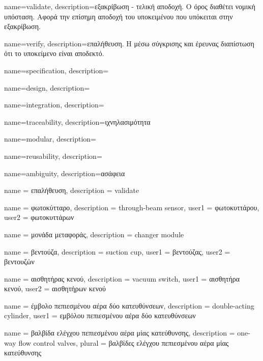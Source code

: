 ﻿%

	{name={validate}, description={εξακρίβωση - τελική αποδοχή. Ο όρος διαθέτει νομική υπόσταση. Αφορά την επίσημη αποδοχή του υποκειμένου που υπόκειται στην εξακρίβωση.}}

	{name={verify}, description={επαλήθευση. Η μέσω σύγκρισης και έρευνας διαπίστωση ότι το υποκείμενο είναι αποδεκτό.}}
	
	{name={specification}, description={}}
	
	{name={design}, description={}}
	
	{name={integration}, description={}}

	{name={traceability}, description={ιχνηλασιμότητα}}

	{name={modular}, description={}}
	
	{name={reusability}, description={}}
	
	{name={ambiguity}, description={ασάφεια}}
	
	
	

	{name			= {επαλήθευση},
	 description		= {validate}
	}
	
	{name			= {φωτοκύτταρο},
	 description	= {through-beam sensor},
	 user1			= {φωτοκυττάρου},
	 user2			= {φωτοκυττάρων}
	}
	
	{name			= {μονάδα μεταφοράς},
	 description	= {changer module}
	}
	
	{name			= {βεντούζα},
	 description	= {suction cup},
	 user1			= {βεντούζας},
	 user2			= {βεντουζών}
	}
	
	{name			= {αισθητήρας κενού},
	 description	= {vacuum switch},
	 user1			= {αισθητήρα κενού},
	 user2			= {αισθητήρων κενού}
	}
	
	{name			= {έμβολο πεπιεσμένου αέρα δύο κατευθύνσεων},
	 description	= {double-acting cylinder},
	 user1			= {εμβόλου πεπιεσμένου αέρα δύο κατευθύνσεων}
	}

	{name			= {βαλβίδα ελέγχου πεπιεσμένου αέρα μίας κατεύθυνσης},
	 description	= {one-way flow control valves},
	 plural			= {βαλβίδες ελέγχου πεπιεσμένου αέρα μίας κατεύθυνσης}
	}
	
